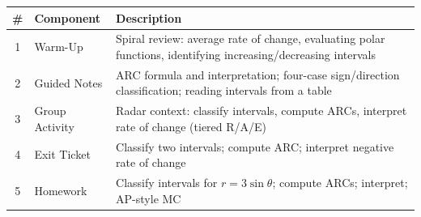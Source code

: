 \documentclass[10pt]{article}
\begin{document}
\begin{tocbox}
\small
\renewcommand{\arraystretch}{1.5}
\begin{tabularx}{\linewidth}{@{} c l X @{}}
\rowcolor{sky}
\textbf{\#} & \textbf{Component} & \textbf{Description} \\
\midrule
1 & Warm-Up        & Spiral review: average rate of change, evaluating polar functions, identifying increasing/decreasing intervals \\
2 & Guided Notes   & ARC formula and interpretation; four-case sign/direction classification; reading intervals from a table \\
3 & Group Activity & Radar context: classify intervals, compute ARCs, interpret rate of change (tiered R/A/E) \\
4 & Exit Ticket    & Classify two intervals; compute ARC; interpret negative rate of change \\
5 & Homework       & Classify intervals for $r=3\sin\theta$; compute ARCs; interpret; AP-style MC \\
\end{tabularx}
\end{tocbox}
\end{document}

